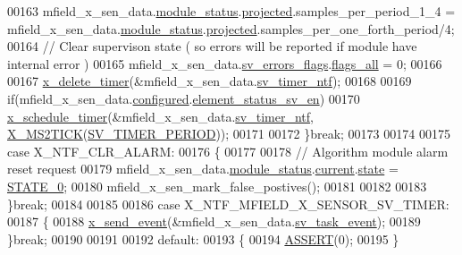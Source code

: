 \begin{DoxyCode}
00163            mfield\_x\_sen\_data.\hyperlink{a00025_adfab5a5d8b45a93dfb13edb24e2b80e3}{module\_status}.\hyperlink{a00019_af2267fb093fb5dcaa006a570a6da3b6b}{projected}.samples\_per\_period\_1\_4  = 
      mfield\_x\_sen\_data.\hyperlink{a00025_adfab5a5d8b45a93dfb13edb24e2b80e3}{module\_status}.\hyperlink{a00019_af2267fb093fb5dcaa006a570a6da3b6b}{projected}.samples\_per\_one\_forth\_period/4;
00164             \textcolor{comment}{// Clear supervison state ( so errors will be reported if module have internal error )}
00165           mfield\_x\_sen\_data.\hyperlink{a00025_aaeec6b0609dba31393f337abf1cce3d3}{sv\_errors\_flags}.\hyperlink{a00022_a1caa87b00c878186140c3bac9c8acf3b}{flags\_all} = 0;
00166 
00167           \hyperlink{a00036_ab69e9af4cfa717e870d587906283635c}{x\_delete\_timer}(&mfield\_x\_sen\_data.\hyperlink{a00025_ada91b200053f2d93e3639dc4ee3415b4}{sv\_timer\_ntf});
00168 
00169           \textcolor{keywordflow}{if}(mfield\_x\_sen\_data.\hyperlink{a00025_a94b2d1f6ea4ab334c74d24984dd27843}{configured}.\hyperlink{a00021_afeb3f74725269028a60926f98890c22b}{element\_status\_sv\_en})
00170           \hyperlink{a00036_a9e3befaa21e83f196f74201deed85346}{x\_schedule\_timer}(&mfield\_x\_sen\_data.\hyperlink{a00025_ada91b200053f2d93e3639dc4ee3415b4}{sv\_timer\_ntf},
      \hyperlink{a00036_a1732cd929c486b3a225824bb2b3dba36}{X\_MS2TICK}(\hyperlink{a00023_a8a535456285f4602701c814d7b69cc68}{SV\_TIMER\_PERIOD}));
00171 
00172         \}\textcolor{keywordflow}{break};
00173 
00174 
00175          \textcolor{keywordflow}{case} X\_NTF\_CLR\_ALARM:
00176         \{
00177 
00178            \textcolor{comment}{// Algorithm module alarm reset request}
00179              mfield\_x\_sen\_data.\hyperlink{a00025_adfab5a5d8b45a93dfb13edb24e2b80e3}{module\_status}.\hyperlink{a00019_acf41ffc11da291c2f9f0fcb02ee72b98}{current}.\hyperlink{a00019_a6b8d8e916bc56265a3fd279bd26b6d1b}{state} = 
      \hyperlink{a00021_ad6739dbbe5581cac99b7dc8a5e09949c}{STATE\_0};
00180              mfield\_x\_sen\_mark\_false\_postives();
00181 
00182 
00183         \}\textcolor{keywordflow}{break};
00184 
00185 
00186         \textcolor{keywordflow}{case} X\_NTF\_MFIELD\_X\_SENSOR\_SV\_TIMER:
00187         \{
00188            \hyperlink{a00036_a4bc3d03c8d62c8237329ed4e969fbc1b}{x\_send\_event}(&mfield\_x\_sen\_data.\hyperlink{a00025_a43c345f39ea3aefbb60ef1ef57fe5d83}{sv\_task\_event});
00189         \}\textcolor{keywordflow}{break};
00190 
00191 
00192         \textcolor{keywordflow}{default}:
00193         \{
00194             \hyperlink{a00072_abb8ff8e213ac9f6fb21d2b968583b936}{ASSERT}(0);
00195         \}

\end{DoxyCode}
